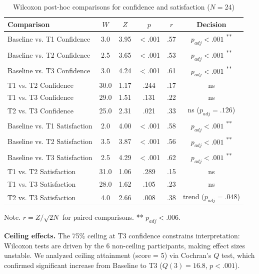 \documentclass[]{llncs}
\begin{document}
\begin{table}[htbp]
\centering
\caption{Wilcoxon post-hoc comparisons for confidence and satisfaction ($N=24$)}
\label{tab:posthoc}

\begin{threeparttable}
\begin{tabular}{lccccc}
\hline
Comparison & $W$ & $Z$ & $p$ & $r$ & Decision \\
\hline
Baseline vs. T1 Confidence & 3.0 & 3.95 & $<$.001 & .57 & $p_{adj}<.001$ \textsuperscript{**} \\
Baseline vs. T2 Confidence & 2.5 & 3.65 & $<$.001 & .53 & $p_{adj}<.001$ \textsuperscript{**} \\
Baseline vs. T3 Confidence & 3.0 & 4.24 & $<$.001 & .61 & $p_{adj}<.001$ \textsuperscript{**} \\
T1 vs. T2 Confidence & 30.0 & 1.17 & .244 & .17 & ns \\
T1 vs. T3 Confidence & 29.0 & 1.51 & .131 & .22 & ns \\
T2 vs. T3 Confidence & 25.0 & 2.31 & .021 & .33 & ns ($p_{adj}=.126$) \\
Baseline vs. T1 Satisfaction & 2.0 & 4.00 & $<$.001 & .58 & $p_{adj}<.001$ \textsuperscript{**} \\
Baseline vs. T2 Satisfaction & 3.5 & 3.87 & $<$.001 & .56 & $p_{adj}<.001$ \textsuperscript{**} \\
Baseline vs. T3 Satisfaction & 2.5 & 4.29 & $<$.001 & .62 & $p_{adj}<.001$ \textsuperscript{**} \\
T1 vs. T2 Satisfaction & 31.0 & 1.06 & .289 & .15 & ns \\
T1 vs. T3 Satisfaction & 28.0 & 1.62 & .105 & .23 & ns \\
T2 vs. T3 Satisfaction & 4.0 & 2.66 & .008 & .38 & trend ($p_{adj}=.048$) \\
\hline
\end{tabular}

\begin{tablenotes}
\footnotesize
\item Note. $r = Z/\sqrt{2N}$ for paired comparisons. ** $p_{adj} < .006$.
\end{tablenotes}

\end{threeparttable}
\end{table}

\textbf{Ceiling effects.} The 75\% ceiling at T3 confidence constrains 
interpretation: Wilcoxon tests are driven by the 6 non-ceiling 
participants, making effect sizes unstable. We analyzed ceiling 
attainment (score = 5) via Cochran's $Q$ test, which confirmed 
significant increase from Baseline to T3 ($Q(3) = 16.8$, $p < .001$).
\end{document}
